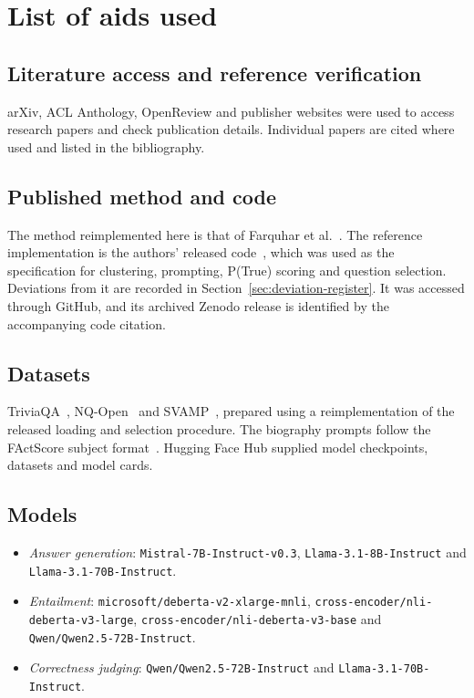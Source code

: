 \chapter*{List of aids used}

\begingroup
{}

\section*{Literature access and reference verification}

arXiv, ACL Anthology, OpenReview and publisher websites were used to access
research papers and check publication details. Individual papers are cited
where used and listed in the bibliography.

\section*{Published method and code}

The method reimplemented here is that of Farquhar et
al.~\cite{semantic_entropy_nature_2024}. The reference implementation is the
authors' released code~\cite{kossen_semantic_uncertainty_code_2024}, which was
used as the specification for clustering, prompting, P(True) scoring and
question selection. Deviations from it are recorded in
Section~\ref{sec:deviation-register}. It was accessed through GitHub, and its
archived Zenodo release is identified by the accompanying code citation.

\section*{Datasets}

TriviaQA~\cite{joshi_triviaqa_2017}, NQ-Open~\cite{lee_nq_open_2019} and
SVAMP~\cite{patel_svamp_2021}, prepared using a reimplementation of the
released loading and selection procedure. The biography prompts follow the
FActScore subject format~\cite{min_factscore_2023}. Hugging Face Hub supplied
model checkpoints, datasets and model cards.

\section*{Models}

\begin{itemize}
  \raggedright\setlength{\itemsep}{0pt}\setlength{\parskip}{0pt}
  \item \emph{Answer generation}: \texttt{Mistral-7B-Instruct-v0.3},
    \texttt{Llama-3.1-8B-Instruct} and \texttt{Llama-3.1-70B-Instruct}.
  \item \emph{Entailment}: \texttt{microsoft/deberta-v2-xlarge-mnli},
    \texttt{cross-encoder/nli-deberta-v3-large},
    \texttt{cross-encoder/nli-deberta-v3-base} and
    \texttt{Qwen/Qwen2.5-72B-Instruct}.
  \item \emph{Correctness judging}: \texttt{Qwen/Qwen2.5-72B-Instruct} and
    \texttt{Llama-3.1-70B-Instruct}.
\end{itemize}

